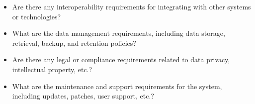 \documentclass[../MasterThesis.tex]{subfiles}
\begin{document}
\begin{itemize}
\item Are there any interoperability requirements for integrating with other systems or technologies?

\item What are the data management requirements, including data storage, retrieval, backup, and retention policies?

\item Are there any legal or compliance requirements related to data privacy, intellectual property, etc.?

\item What are the maintenance and support requirements for the system, including updates, patches, user support, etc.?
	
\end{itemize}	
	
	
	
	
\end{document}
